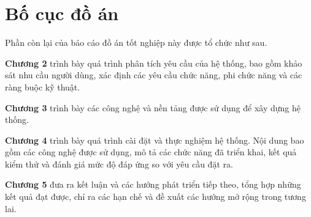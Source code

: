 \documentclass[../DoAn.tex]{subfiles}
\begin{document}
\section{Bố cục đồ án}
\label{section:1.3}

Phần còn lại của báo cáo đồ án tốt nghiệp này được tổ chức như sau.

\textbf{Chương 2} trình bày quá trình phân tích yêu cầu của hệ thống, bao gồm khảo sát nhu cầu người dùng, xác định các yêu cầu chức năng, phi chức năng và các ràng buộc kỹ thuật.

\textbf{Chương 3} trình bày các công nghệ và nền tảng được sử dụng để xây dựng hệ thống.

\textbf{Chương 4} trình bày quá trình cài đặt và thực nghiệm hệ thống. Nội dung bao gồm các công nghệ được sử dụng, mô tả các chức năng đã triển khai, kết quả kiểm thử và đánh giá mức độ đáp ứng so với yêu cầu đặt ra.

\textbf{Chương 5} đưa ra kết luận và các hướng phát triển tiếp theo, tổng hợp những kết quả đạt được, chỉ ra các hạn chế và đề xuất các hướng mở rộng trong tương lai.
\end{document}
